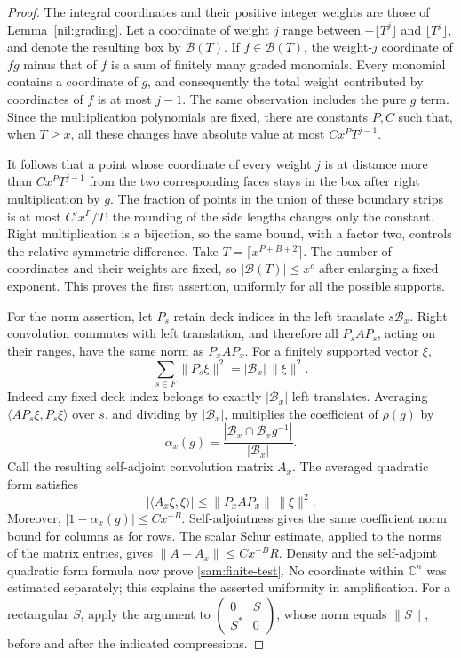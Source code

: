 \begin{proof}
The integral coordinates and their positive integer weights are those
of Lemma~\ref{nil:grading}.  Let a coordinate of weight \(j\) range
between \(-\lfloor T^j\rfloor\) and \(\lfloor T^j\rfloor\), and denote
the resulting box by \(\mathcal B(T)\).  If \(f\in\mathcal B(T)\),
the weight-\(j\) coordinate of \(fg\) minus that of \(f\) is a sum of
finitely many graded monomials.  Every monomial contains a coordinate
of \(g\), and consequently the total weight contributed by coordinates
of \(f\) is at most \(j-1\).  The same observation includes the pure
\(g\) term.  Since the multiplication polynomials are fixed, there are
constants \(P,C\) such that, when \(T\ge x\), all these changes have
absolute value at most \(Cx^P T^{j-1}\).

It follows that a point whose coordinate of every weight \(j\) is at
distance more than \(Cx^P T^{j-1}\) from the two corresponding faces
stays in the box after right multiplication by \(g\).  The fraction
of points in the union of these boundary strips is at most
\(C'x^P/T\); the rounding of the side lengths changes only the
constant.  Right multiplication is a bijection, so the same bound,
with a factor two, controls the relative symmetric difference.  Take
\(T=\lceil x^{P+B+2}\rceil\).  The number of coordinates and their
weights are fixed, so \(|\mathcal B(T)|\le x^c\) after enlarging a
fixed exponent.  This proves the first assertion, uniformly for all
the possible supports.

For the norm assertion, let \(P_s\) retain deck indices in the left
translate \(s\mathcal B_x\).  Right convolution commutes with left
translation, and therefore all \(P_sAP_s\), acting on their ranges,
have the same norm as \(P_xAP_x\).  For a finitely supported vector
\(\xi\),
\[
 \sum_{s\in F}\|P_s\xi\|^2=|\mathcal B_x|\,\|\xi\|^2.
\]
Indeed any fixed deck index belongs to exactly \(|\mathcal B_x|\)
left translates.  Averaging \(\langle AP_s\xi,P_s\xi\rangle\)
over \(s\), and dividing by \(|\mathcal B_x|\), multiplies the
coefficient of \(\rho(g)\) by
\[
 \alpha_x(g)=\frac{|\mathcal B_x\cap\mathcal B_x g^{-1}|}
 {|\mathcal B_x|}.
\]
Call the resulting self-adjoint convolution matrix \(A_x\).  The
averaged quadratic form satisfies
\[
 |\langle A_x\xi,\xi\rangle|
 \le\|P_xAP_x\|\,\|\xi\|^2.
\]
Moreover, \(|1-\alpha_x(g)|\le Cx^{-B}\).  Self-adjointness gives
the same coefficient norm bound for columns as for rows.  The scalar
Schur estimate, applied to the norms of the matrix entries, gives
\(\|A-A_x\|\le Cx^{-B}R\).  Density and the self-adjoint quadratic
form formula now prove \eqref{sam:finite-test}.  No coordinate within
\(\mathbb C^n\) was estimated separately; this explains the asserted
uniformity in amplification.  For a rectangular \(S\), apply the
argument to
\(\left(\begin{smallmatrix}0&S\\S^*&0\end{smallmatrix}\right)\),
whose norm equals \(\|S\|\), before and after the indicated
compressions.
\end{proof}

